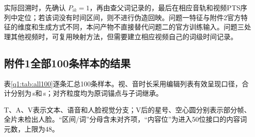 实际回溯时，先确认 $P_{ik}=1$，再由查父词记录的，最后在相应音轨和视频PTS序列中定位；若该词没有时间区间，则不进行伪造回映。问题一特征与附件2官方特征的维度和生成方式不同，本问产物不直接替代问题二的官方训练输入。问题三处理其他视频时，可复用映射方法，但需要建立相应视频自己的词级时间记录。

\subsection{附件1全部100条样本的结果}

表\ref{q1:tab:all100}逐条汇总100条样本。视、音时长采用编辑列表有效呈现口径，合计分别为\VideoDuration\,s和\AudioDuration\,s；对齐粒度均为原词锚点与子词继承。

T、A、V表示文本、语音和人脸视觉分支；V后的星号、空心圆分别表示部分帧、全片未检出人脸。“区间/词”分母含未对齐项，“内容位”为进入50位接口的内容词元数，上限为48。

